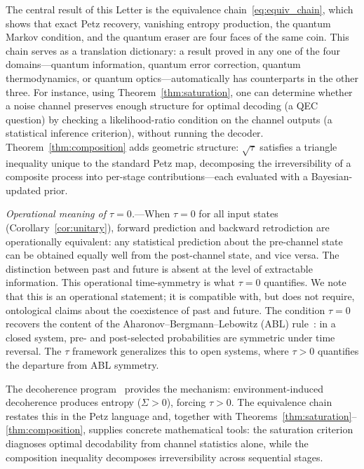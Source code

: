 \documentclass[prl,twocolumn,superscriptaddress,longbibliography,floatfix]{revtex4-2}
\newcommand{\tauasym}{\tau}
\begin{document}
The central result of this Letter is the equivalence
chain~\eqref{eq:equiv_chain}, which shows that exact Petz
recovery, vanishing entropy production, the quantum Markov
condition, and the quantum eraser are four faces of the same
coin.  This chain serves as a translation dictionary: a result
proved in any one of the four domains---quantum information,
quantum error correction, quantum thermodynamics, or quantum
optics---automatically has counterparts in the other three.
For instance, using Theorem~\ref{thm:saturation}, one can
determine whether a noise channel preserves enough structure
for optimal decoding (a QEC question) by checking a
likelihood-ratio condition on the channel outputs (a
statistical inference criterion), without running the decoder.
Theorem~\ref{thm:composition} adds geometric structure:
$\sqrt{\tauasym}$ satisfies a triangle inequality unique to the
standard Petz map, decomposing the irreversibility of a
composite process into per-stage contributions---each evaluated
with a Bayesian-updated prior.

\emph{Operational meaning of $\tauasym = 0$.}---When $\tauasym = 0$
for all input states (Corollary~\ref{cor:unitary}), forward
prediction and backward retrodiction are operationally
equivalent: any statistical prediction about the pre-channel state
can be obtained equally well from the post-channel state, and vice
versa.  The distinction between past and future is absent at the
level of extractable information.  This operational time-symmetry
is what $\tauasym = 0$ quantifies.  We note that this is an
operational statement; it is compatible with, but does not require,
ontological claims about the coexistence of past and future.
The condition $\tauasym = 0$ recovers the content of the
Aharonov--Bergmann--Lebowitz (ABL)
rule~\cite{ABL1964}: in a closed system, pre- and post-selected
probabilities are symmetric under time reversal.
The $\tauasym$ framework generalizes this to open systems, where
$\tauasym > 0$ quantifies the departure from ABL symmetry.

The decoherence program~\cite{Zurek2003,Zeh1970} provides the
mechanism: environment-induced decoherence produces
entropy ($\Sigma > 0$), forcing $\tauasym > 0$.
The equivalence chain restates this in the Petz language
and, together with
Theorems~\ref{thm:saturation}--\ref{thm:composition},
supplies concrete mathematical tools: the saturation criterion
diagnoses optimal decodability from channel statistics alone,
while the composition inequality decomposes irreversibility
across sequential stages.
\end{document}
